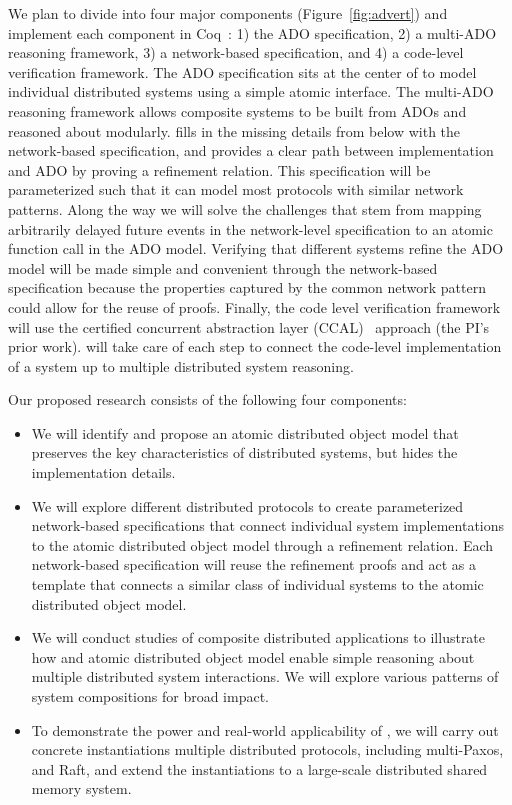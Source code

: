 We plan to divide \sysname{} into four major components
(Figure~\ref{fig:advert}) and implement each component in
Coq~\cite{coq}: 1) the ADO specification, 2) a multi-ADO reasoning
framework, 3) a network-based specification, and 4) a code-level
verification framework.  The ADO specification sits at the center of
\sysname{} to model individual distributed systems using a simple
atomic interface. The multi-ADO reasoning framework allows composite
systems to be built from ADOs and reasoned about modularly. \sysname{}
fills in the missing details from below with the network-based
specification, and provides a clear path between implementation and
ADO by proving a refinement relation. This specification will be
parameterized such that it can model most protocols with similar
network patterns. Along the way we will solve the challenges that stem
from mapping arbitrarily delayed future events in the network-level
specification to an atomic function call in the ADO model. Verifying
that different systems refine the ADO model will be made simple and
convenient through the network-based specification because the
properties captured by the common network pattern could allow for the
reuse of proofs. Finally, the code level verification framework will
use the certified concurrent abstraction layer
(CCAL)~\cite{concurrency} approach (the PI's prior work).  \sysname{}
will take care of each step to connect the code-level implementation
of a system up to multiple distributed system reasoning.

Our proposed research consists of the following four components:
\begin{itemize}%
\item We will identify and propose an atomic distributed object model
  that preserves the key characteristics of distributed systems, but
  hides the implementation details.
\item We will explore different distributed protocols to create
  parameterized network-based specifications that connect individual
  system implementations to the atomic distributed object model
  through a refinement relation. Each network-based specification will
  reuse the refinement proofs and act as a template that connects a
  similar class of individual systems to the atomic distributed object
  model.
\item We will conduct studies of composite distributed applications to
  illustrate how \sysname{} and atomic distributed object model enable
  simple reasoning about multiple distributed system interactions. We
  will explore various patterns of system compositions for broad
  impact.
\item To demonstrate the power and real-world applicability of
  \sysname{}, we will carry out concrete instantiations multiple
  distributed protocols, including multi-Paxos, and Raft, and extend
  the instantiations to a large-scale distributed shared memory
  system.
\end{itemize}
